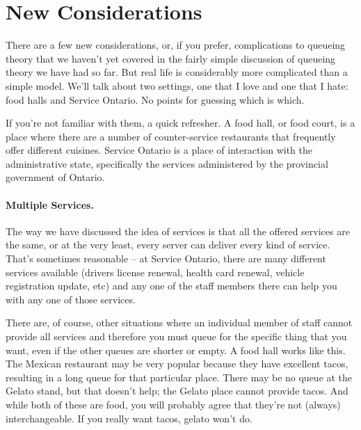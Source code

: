

\newcommand{\FPP}{FastPass\nolinebreak\hspace{-.05em}\raisebox{.4ex}{\tiny\bf +}\nolinebreak\hspace{-.10em}\raisebox{.4ex}{\tiny\bf +}}
\def\FPP{{FastPass\nolinebreak[4]\hspace{-.05em}\raisebox{.4ex}{\tiny\bf ++}}}




\section*{New Considerations}

There are a few new considerations, or, if you prefer, complications to queueing theory that we haven't yet covered in the fairly simple discussion of queueing theory we have had so far. But real life is considerably more complicated than a simple model. We'll talk about two settings, one that I love and one that I hate: food halls and Service Ontario. No points for guessing which is which.

If you're not familiar with them, a quick refresher. A food hall, or food court, is a place where there are a number of counter-service restaurants that frequently offer different cuisines. Service Ontario is a place of interaction with the administrative state, specifically the services administered by the provincial government of Ontario.

\paragraph{Multiple Services.} The way we have discussed the idea of services is that all the offered services are the same, or at the very least, every server can deliver every kind of service. That's sometimes reasonable -- at Service Ontario, there are many different services available (drivers license renewal, health card renewal, vehicle registration update, etc) and any one of the staff members there can help you with any one of those services.

There are, of course, other situations where an individual member of staff cannot provide all services and therefore you must queue for the specific thing that you want, even if the other queues are shorter or empty. A food hall works like this. The Mexican restaurant may be very popular because they have excellent tacos, resulting in a long queue for that particular place. There may be no queue at the Gelato stand, but that doesn't help; the Gelato place cannot provide tacos. And while both of these are food, you will probably agree that they're not (always) interchangeable. If you really want tacos, gelato won't do.

